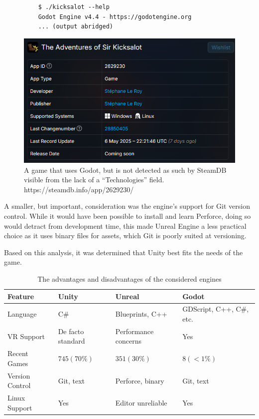 \documentclass[sigconf,authordraft]{acmart}
\begin{document}
\begin{figure}
  \begin{lstlisting}
    $ ./kicksalot --help
    Godot Engine v4.4 - https://godotengine.org
    ... (output abridged)
  \end{lstlisting}
  \includegraphics[width=0.8\linewidth]{godot-false-negative.png}
  \caption{\label{fig:godot_false_negative} A game that uses Godot, but is not
    detected as such by SteamDB visible from the lack of a ``Technologies''
  field. https://steamdb.info/app/2629230/}
\end{figure}

A smaller, but important, consideration was the engine's support for Git version
control. While it would have been possible to install and learn Perforce, doing
so would detract from development time, this made Unreal Engine a less practical
choice as it uses binary files for assets, which Git is poorly suited at
versioning.

Based on this analysis, it was determined that Unity best fits the needs of the
game.

\begin{table}
  \caption{The advantages and disadvantages of the considered engines}
  \label{table:engine_compare}
  \begin{tabular}{llll}\toprule
    Feature & Unity & Unreal & Godot \\\midrule

    Language & C\# & Blueprints, C++ & GDScript, C++, C\#, etc. \\
    VR Support & De facto standard & Performance concerns & Yes \\
    Recent Games & $745 (70\%)$ & $351 (30\%)$ & $8 (<1\%)$ \\
    Version Control & Git, text & Perforce, binary & Git, text \\
    Linux Support & Yes & Editor unreliable & Yes \\

    \bottomrule
  \end{tabular}
\end{table}
\end{document}
